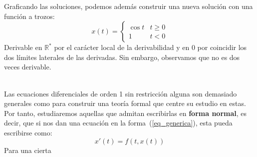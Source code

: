 \begin{ejemplo}
\begin{center}
    \end{center}

    Graficando las soluciones, podemos además construir una nueva solución con una función a trozos:
    \begin{equation*}
        x(t) = \left\{\begin{array}{ll}
                \cos t & t \geq 0 \\
                1 & t<0
        \end{array}\right.
    \end{equation*}
    Derivable en $\mathbb{R}^*$ por el carácter local de la derivabilidad y en 0 por coincidir los dos límites laterales de las derivadas. Sin embargo, observamos que no es dos veces derivable.
\end{ejemplo}~\\

Las ecuaciones diferenciales de orden 1 sin restricción alguna son demasiado generales como para construir una teoría formal que centre su estudio en estas. Por tanto, estudiaremos aquellas que admitan escribirlas en \textbf{forma normal}, es decir, que si nos dan una ecuación en la forma~(\ref{eq_generica}), esta pueda escribirse como:
\begin{equation}\label{eq_generica_normal}
    x'(t) = f(t,x(t))
\end{equation}
Para una cierta


